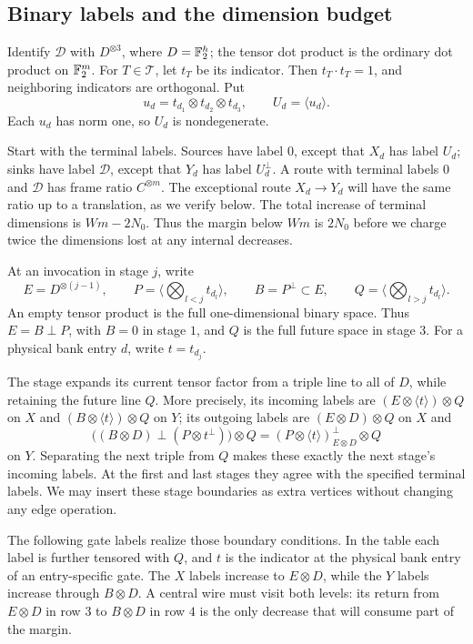 \subsection{Binary labels and the dimension budget}

Identify $\mathcal D$ with $D^{\otimes3}$, where $D=\mathbb F_2^h$;
the tensor dot product is the ordinary dot product on $\mathbb F_2^m$.
For $T\in\mathcal T$, let $t_T$ be its indicator.
Then $t_T\cdot t_T=1$, and neighboring indicators are orthogonal.
Put
\[
 u_d=t_{d_1}\otimes t_{d_2}\otimes t_{d_3},\qquad
 U_d=\langle u_d\rangle.
\]
Each $u_d$ has norm one, so $U_d$ is nondegenerate.

Start with the terminal labels.  Sources have label $0$, except that
$X_d$ has label $U_d$; sinks have label $\mathcal D$, except that
$Y_d$ has label $U_d^\perp$.  A route with terminal labels $0$ and
$\mathcal D$ has frame ratio $C^{\otimes m}$.  The exceptional
route $X_d\to Y_d$ will have the same ratio up to a translation, as
we verify below.  The total increase of terminal dimensions is
$Wm-2N_0$.  Thus the margin below $Wm$ is $2N_0$ before we
charge twice the dimensions lost at any internal decreases.

At an invocation in stage $j$, write
\[
 E=D^{\otimes(j-1)},\qquad
 P=\Big\langle\bigotimes_{l<j}t_{d_l}\Big\rangle,
 \qquad B=P^\perp\subset E,\qquad
 Q=\Big\langle\bigotimes_{l>j}t_{d_l}\Big\rangle.
\]
An empty tensor product is the full one-dimensional binary space.
Thus $E=B\mathbin\perp P$, with $B=0$ in stage $1$, and $Q$ is
the full future space in stage $3$.
For a physical bank entry $d$, write $t=t_{d_j}$.

The stage expands its current tensor factor from a triple line to
all of $D$, while retaining the future line $Q$.  More precisely,
its incoming labels are
$(E\otimes\langle t\rangle)\otimes Q$ on $X$ and
$(B\otimes\langle t\rangle)\otimes Q$ on $Y$; its outgoing
labels are $(E\otimes D)\otimes Q$ on $X$ and
\[
 \bigl((B\otimes D)\mathbin\perp(P\otimes t^\perp)\bigr)\otimes Q
 = (P\otimes\langle t\rangle)^\perp_{E\otimes D}\otimes Q
\]
on $Y$.  Separating the next triple from $Q$ makes these exactly
the next stage's incoming labels.  At the first and last stages
they agree with the specified terminal labels.  We may insert these
stage boundaries as extra vertices without changing any edge operation.

The following gate labels realize those boundary conditions.  In the
table each label is further tensored with $Q$, and $t$ is the
indicator at the physical bank entry of an entry-specific gate.
The $X$ labels increase to $E\otimes D$, while the $Y$ labels
increase through $B\otimes D$.  A central wire must visit both
levels: its return from $E\otimes D$ in row $3$ to $B\otimes D$
in row $4$ is the only decrease that will consume part of the margin.

